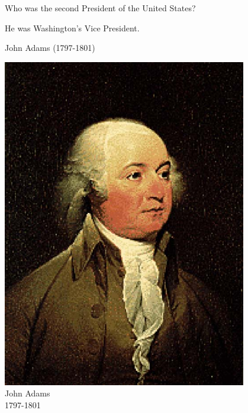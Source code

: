 \documentclass{article}
\def\rescale{.4} %
\begin{document}
\begin{card}
    Who was the second President of the United States?
    \begin{response}
        \begin{hint}
            He was Washington's Vice President.
        \end{hint}
        \begin{answer}
        \ifecListing
            John Adams (1797-1801)
        \else
            \begin{center}
                \includegraphics[scale=\rescale]{presidents/ja2}\\
                    John Adams\\
                    1797-1801
            \end{center}
        \fi
        \end{answer}
    \end{response}
\end{card}
\end{document}
